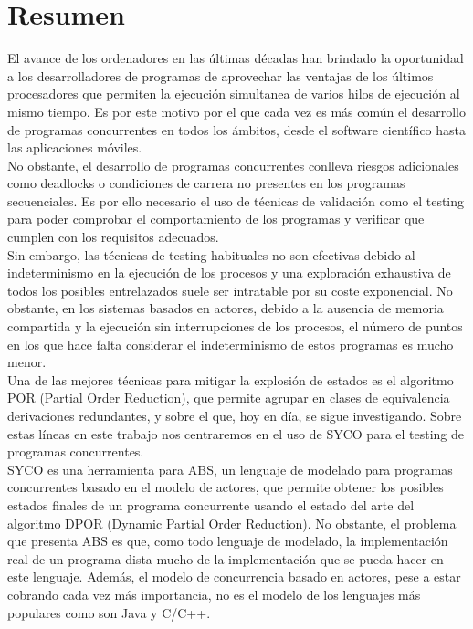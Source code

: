\chapter*{Resumen}
\thispagestyle{empty}
El avance de los ordenadores en las últimas décadas han brindado la oportunidad a los desarrolladores de programas de aprovechar las ventajas de los últimos procesadores que permiten la ejecución simultanea de varios hilos de ejecución al mismo tiempo. Es por este motivo por el que cada vez es más común el desarrollo de programas concurrentes en todos los ámbitos, desde el software científico hasta las aplicaciones móviles.\\

No obstante, el desarrollo de programas concurrentes conlleva riesgos adicionales como deadlocks o condiciones de carrera no presentes en los programas secuenciales. Es por ello necesario el uso de técnicas de validación como el testing para poder comprobar el comportamiento de los programas y verificar que cumplen con los requisitos adecuados.\\

Sin embargo, las técnicas de testing habituales no son efectivas debido al indeterminismo en la ejecución de los procesos y una exploración exhaustiva de todos los posibles entrelazados suele ser intratable por su coste exponencial. No obstante, en los sistemas basados en actores, debido a la ausencia de memoria compartida y la ejecución sin interrupciones de los procesos, el número de puntos en los que hace falta considerar el indeterminismo de estos programas es mucho menor.\\

Una de las mejores técnicas para mitigar la explosión de estados es el algoritmo POR (Partial Order Reduction), que permite agrupar en clases de equivalencia derivaciones redundantes, y sobre el que, hoy en día, se sigue investigando. Sobre estas líneas en este trabajo nos centraremos en el uso de SYCO para el testing de programas concurrentes.\\

SYCO es una herramienta para ABS, un lenguaje de modelado para programas concurrentes basado en el modelo de actores, que permite obtener los posibles estados finales de un programa concurrente usando el estado del arte del algoritmo DPOR (Dynamic Partial Order Reduction). No obstante, el problema que presenta ABS es que, como todo lenguaje de modelado, la implementación real de un programa dista mucho de la implementación que se pueda hacer en este lenguaje. Además, el modelo de concurrencia basado en actores, pese a estar cobrando cada vez más importancia, no es el modelo de los lenguajes más populares como son Java y C/C++.\\


